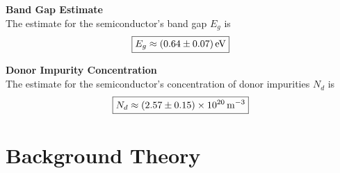 \documentclass[11pt, a4paper]{article}
\begin{document}
\vspace{2mm}
\textbf{Band Gap Estimate}\\
The estimate for the semiconductor's band gap $ E_{g} $ is
\begin{equation*}
	\boxed{E_{g} \approx \SI{0.64 \pm 0.07}{\electronvolt}}
\end{equation*}

\vspace{2mm}
\textbf{Donor Impurity Concentration}\\
The estimate for the semiconductor's concentration of donor impurities $ N_{d} $ is
\begin{equation*}
	\boxed{N_{d} \approx \SI{2.57 \pm 0.15 e20}{\meter^{-3}}}
\end{equation*}
		
\appendix

\section{Background Theory}
\end{document}
